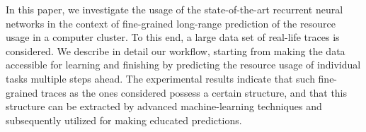 In this paper, we investigate the usage of the state-of-the-art recurrent neural
networks in the context of fine-grained long-range prediction of the resource
usage in a computer cluster. To this end, a large data set of real-life traces
is considered. We describe in detail our workflow, starting from making the data
accessible for learning and finishing by predicting the resource usage of
individual tasks multiple steps ahead. The experimental results indicate that
such fine-grained traces as the ones considered possess a certain structure, and
that this structure can be extracted by advanced machine-learning techniques and
subsequently utilized for making educated predictions.
